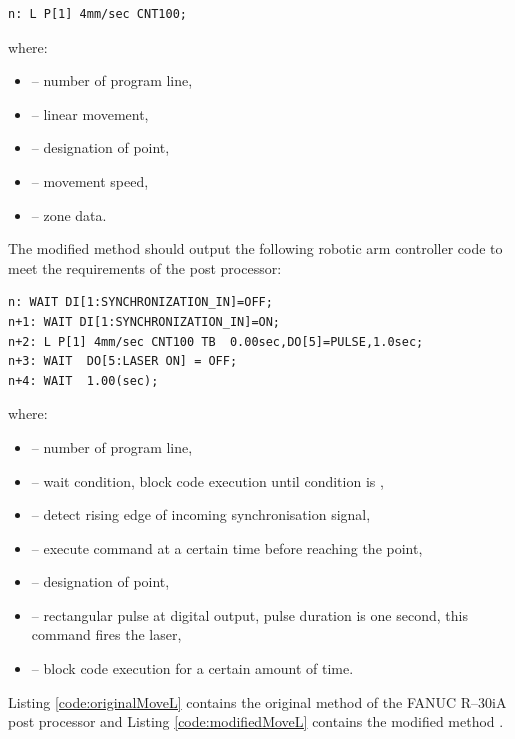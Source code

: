 \begin{lstlisting}[frame=lines,numbers=none,breaklines=true, language={}]
n: L P[1] 4mm/sec CNT100;
\end{lstlisting}


where:

\begin{itemize}

    \item {} -- number of program line, 
    \item {} -- linear movement,
    \item {} -- designation of point,
    \item {} -- movement speed,
    \item {} -- zone data.

\end{itemize}
The modified  method should output the following robotic arm controller code to meet the requirements of the post processor:


\begin{lstlisting}[frame=lines,numbers=none,breaklines=true, language={}]
n: WAIT DI[1:SYNCHRONIZATION_IN]=OFF;
n+1: WAIT DI[1:SYNCHRONIZATION_IN]=ON;
n+2: L P[1] 4mm/sec CNT100 TB  0.00sec,DO[5]=PULSE,1.0sec;
n+3: WAIT  DO[5:LASER ON] = OFF;
n+4: WAIT  1.00(sec);
\end{lstlisting}


where:

\begin{itemize}

    \item {} -- number of program line, 
    \item {} -- wait condition, block code execution until condition  is ,
    \item {} -- detect rising edge of incoming synchronisation signal,
    \item {} -- execute command at a certain time before reaching the point,
    \item {} -- designation of point,
    \item {} -- rectangular pulse at digital output, pulse duration is one second, this command fires the laser,
    \item {} -- block code execution for a certain amount of time.

\end{itemize}
Listing \ref{code:originalMoveL} contains the original  method of the FANUC R--30iA post processor and Listing \ref{code:modifiedMoveL} contains the modified  method \cite{postmethods}. 



